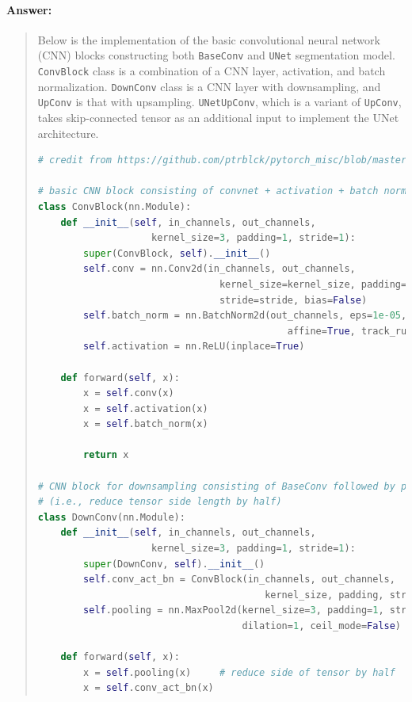 \documentclass[11pt]{article}
\begin{document}
\paragraph{Answer:} 
\begin{quote} 

Below is the implementation of the basic convolutional neural network (CNN) blocks constructing both \texttt{BaseConv} and \texttt{UNet} segmentation model. \texttt{ConvBlock} class is a combination of a CNN layer, activation, and batch normalization. \texttt{DownConv} class is a CNN layer with downsampling, and \texttt{UpConv} is that with upsampling. \texttt{UNetUpConv}, which is a variant of \texttt{UpConv}, takes skip-connected tensor as an additional input to implement the UNet architecture.

\begin{lstlisting}[language=Python, basicstyle=\scriptsize]
# credit from https://github.com/ptrblck/pytorch_misc/blob/master/unet_demo.py

# basic CNN block consisting of convnet + activation + batch normalization
class ConvBlock(nn.Module):
    def __init__(self, in_channels, out_channels, 
                    kernel_size=3, padding=1, stride=1):
        super(ConvBlock, self).__init__()
        self.conv = nn.Conv2d(in_channels, out_channels, 
                                kernel_size=kernel_size, padding=padding, 
                                stride=stride, bias=False)
        self.batch_norm = nn.BatchNorm2d(out_channels, eps=1e-05, momentum=0.1, 
                                            affine=True, track_running_stats=True)
        self.activation = nn.ReLU(inplace=True)
    
    def forward(self, x):
        x = self.conv(x)
        x = self.activation(x)
        x = self.batch_norm(x)
    
        return x

# CNN block for downsampling consisting of BaseConv followed by pooling 
# (i.e., reduce tensor side length by half)
class DownConv(nn.Module):
    def __init__(self, in_channels, out_channels, 
                    kernel_size=3, padding=1, stride=1):
        super(DownConv, self).__init__()
        self.conv_act_bn = ConvBlock(in_channels, out_channels, 
                                        kernel_size, padding, stride)
        self.pooling = nn.MaxPool2d(kernel_size=3, padding=1, stride=2, 
                                    dilation=1, ceil_mode=False)
        
    def forward(self, x):
        x = self.pooling(x)     # reduce side of tensor by half
        x = self.conv_act_bn(x)   


\end{lstlisting}
\end{quote}
\end{document}
